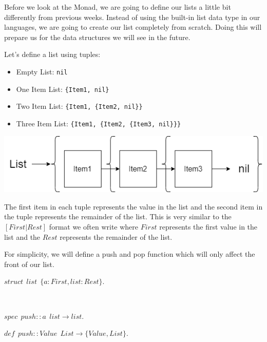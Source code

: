 \documentclass[
]{book}
\providecommand{\tightlist}{%
  \setlength{\itemsep}{0pt}\setlength{\parskip}{0pt}}
\begin{document}
Before we look at the Monad, we are going to define our lists a little bit differently from previous weeks. Instead of using the built-in list data type in our languages, we are going to create our list completely from scratch. Doing this will prepare us for the data structures we will see in the future.

Let's define a list using tuples:

\begin{itemize}
\tightlist
\item
  Empty List: \texttt{nil}
\item
  One Item List: \texttt{\{Item1,\ nil\}}
\item
  Two Item List: \texttt{\{Item1,\ \{Item2,\ nil\}\}}
\item
  Three Item List: \texttt{\{Item1,\ \{Item2,\ \{Item3,\ nil\}\}\}}
\end{itemize}

\includegraphics{images/ThreeItemCustomList.drawio.png}

The first item in each tuple represents the value in the list and the second item in the tuple represents the remainder of the list. This is very similar to the \([First|Rest]\) format we often write where \(First\) represents the first value in the list and the \(Rest\) represents the remainder of the list.

For simplicity, we will define a push and pop function which will only affect the front of our list.

\begin{formulabox}
\(struct ~ ~ list ~ ~ \lbrace a:First, list:Rest \rbrace.\)

\end{formulabox}

\(\nonumber\)

\begin{formulabox}
\(spec ~ ~ push :: a ~ ~ list \rightarrow list.\)

\(de\mathit{f} ~ ~ push :: Value ~ ~ List \rightarrow \lbrace Value, List \rbrace.\)

\end{formulabox}

\(\nonumber\)
\end{document}
